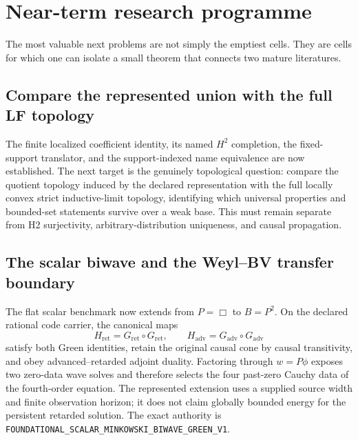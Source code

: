 \documentclass[11pt]{article}
\theoremstyle{definition}
\theoremstyle{remark}
\newcommand{\cert}[1]{\nolinkurl{#1}}
\begin{document}
\section{Near-term research programme}
\label{sec:agenda}

The most valuable next problems are not simply the emptiest cells.  They are
cells for which one can isolate a small theorem that connects two mature
literatures.

\subsection{Compare the represented union with the full LF topology}

The finite localized coefficient identity, its named \(H^2\) completion, the
fixed-support translator, and the support-indexed name equivalence are now
established.  The next target is the genuinely topological question: compare
the quotient topology induced by the declared representation with the full
locally convex strict inductive-limit topology, identifying which universal
properties and bounded-set statements survive over a weak base.  This must
remain separate from H2 surjectivity, arbitrary-distribution uniqueness, and
causal propagation.

\subsection{The scalar biwave and the Weyl--BV transfer boundary}

The flat scalar benchmark now extends from \(P=\Box\) to \(B=P^2\).  On the
declared rational code carrier, the canonical maps
\[
 H_{\mathrm{ret}}=G_{\mathrm{ret}}\circ G_{\mathrm{ret}},\qquad
 H_{\mathrm{adv}}=G_{\mathrm{adv}}\circ G_{\mathrm{adv}}
\]
satisfy both Green identities, retain the original causal cone by causal
transitivity, and obey advanced--retarded adjoint duality.  Factoring through
\(w=P\phi\) exposes two zero-data wave solves and therefore selects the four
past-zero Cauchy data of the fourth-order equation.  The represented extension
uses a supplied source width and finite observation horizon; it does not claim
globally bounded energy for the persistent retarded solution.
The exact authority is
\cert{FOUNDATIONAL_SCALAR_MINKOWSKI_BIWAVE_GREEN_V1}.
\end{document}
